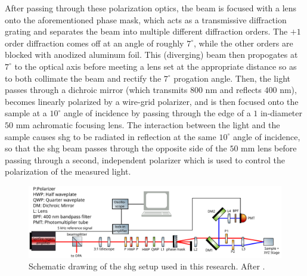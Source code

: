 After passing through these polarization optics, the beam is focused with a lens onto the aforementioned phase mask, which acts as a transmissive diffraction grating and separates the beam into multiple different diffraction orders.
The $+1$ order diffraction comes off at an angle of roughly $7^\circ$, while the other orders are blocked with anodized aluminum foil. 
This (diverging) beam then propogates at $7^\circ$ to the optical axis before meeting a lens set at the appropriate distance so as to both collimate the beam and rectify the $7^\circ$ progation angle.
Then, the light passes through a dichroic mirror (which transmits $800$ \si{nm} and reflects $400$ \si{nm}), becomes linearly polarized by a wire-grid polarizer, and is then focused onto the sample at a $10^\circ$ angle of incidence by passing through the edge of a $1$ \si{in}-diameter $50$ \si{mm} achromatic focusing lens.
The interaction between the light and the sample causes \gls{shg} to be radiated in reflection at the same $10^\circ$ angle of incidence, so that the \gls{shg} beam passes through the opposite side of the $50$ \si{mm} lens before passing through a second, independent polarizer which is used to control the polarization of the measured light.

\begin{figure}
\includegraphics[width=\textwidth]{gfx/ch3/pdf/setup.pdf}
\caption[Schematic drawing of the SHG setup used in this research.]{\label{fig:setup}Schematic drawing of the \gls{shg} setup used in this research. After \citet{morey_automated_2024}.}
\end{figure}

